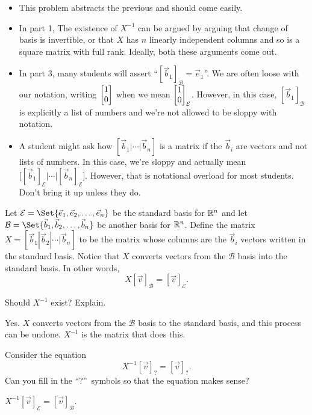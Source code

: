 \documentclass{workbook}
\begin{document}
\begin{slide}
\begin{annotation}
		\begin{notes}
			\begin{itemize}
				\item This problem abstracts the previous and should come easily.
				\item In part 1, The existence of $X^{-1}$ can be argued by arguing that change of basis
					is invertible, or that $X$ has $n$ linearly independent columns and
					so is a square matrix with full rank. Ideally, both these arguments come out.
				\item In part 3, many students will assert ``$[\vec b_1]_{\mathcal B}=\vec e_1$''.
					We are often loose with our notation, writing $\mat{1\\0}$
					when we mean $\mat{1\\0}_{\mathcal E}$. However, in this case,
					$[\vec b_1]_{\mathcal B}$ is explicitly a list of numbers and we're
					not allowed to be sloppy with notation.
				\item A student might ask how $[\vec b_1|\cdots|\vec b_n]$ is a matrix if the $\vec b_i$
					are vectors and not lists of numbers. In this case, we're sloppy and actually
					mean $\Big[[\vec b_1]_{\mathcal E}|\cdots|[\vec b_n]_{\mathcal E}\Big]$. However, that is
					notational overload for most students. Don't bring it up unless they do.
			\end{itemize}
		\end{notes}
	\end{annotation}
	Let $\mathcal E=\Set{\vec e_1,\vec e_2,\ldots,\vec e_n}$ be the standard basis for $\mathbb{R}^n$
	and let $\mathcal B=\Set{\vec b_1,\vec b_2,\ldots,\vec b_n}$ be another basis for $\mathbb{R}^n$.
	Define the matrix $X=[\vec b_1|\vec b_2|\cdots|\vec b_n]$ to be the matrix whose columns are the $\vec b_i$ vectors
	written in the standard basis. Notice that $X$ converts
	vectors from the $\mathcal B$ basis into the standard basis. In other words,
	\[
		X[\vec v]_{\mathcal B} = [\vec v]_{\mathcal E}.
	\]
	\begin{parts}
		\item Should $X^{-1}$ exist? Explain.
			\begin{solution}
				Yes. $X$ converts vectors from the
				$\mathcal B$ basis to the standard basis, and this process can be undone.
				$X^{-1}$ is the matrix that does this.
			\end{solution}
		\item Consider the equation
			\[
				X^{-1}[\vec v]_{?} = [\vec v]_{?}.
			\]
			Can you fill in the ``?''~symbols so that the equation makes sense?
			\begin{solution}
				$X^{-1}[\vec v]_{\mathcal E} = [\vec v]_{\mathcal B}$.


\end{solution}
\end{parts}
\end{slide}
\end{document}
